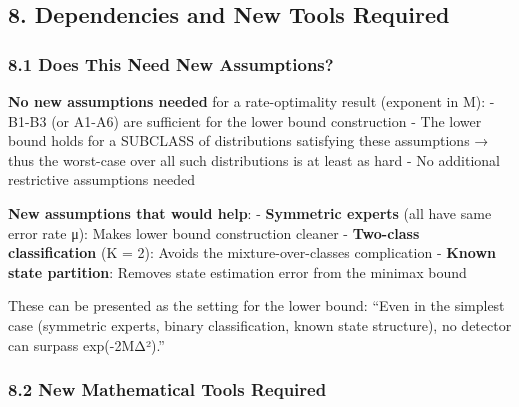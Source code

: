 \documentclass[
  12pt,
]{article}
\begin{document}
\subsection{8. Dependencies and New Tools
Required}\label{dependencies-and-new-tools-required}

\subsubsection{8.1 Does This Need New
Assumptions?}\label{does-this-need-new-assumptions}

\textbf{No new assumptions needed} for a rate-optimality result
(exponent in M): - B1-B3 (or A1-A6) are sufficient for the lower bound
construction - The lower bound holds for a SUBCLASS of distributions
satisfying these assumptions → thus the worst-case over all such
distributions is at least as hard - No additional restrictive
assumptions needed

\textbf{New assumptions that would help}: - \textbf{Symmetric experts}
(all have same error rate μ): Makes lower bound construction cleaner -
\textbf{Two-class classification} (K = 2): Avoids the
mixture-over-classes complication - \textbf{Known state partition}:
Removes state estimation error from the minimax bound

These can be presented as the setting for the lower bound: ``Even in the
simplest case (symmetric experts, binary classification, known state
structure), no detector can surpass exp(-2MΔ²).''

\subsubsection{8.2 New Mathematical Tools
Required}\label{new-mathematical-tools-required}
\end{document}
